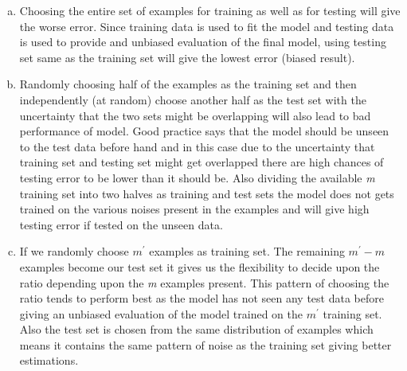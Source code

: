 \documentclass[12pt,letterpaper]{article}
\begin{document}
\begin{enumerate}[a.]
    \item Choosing the entire set of examples for training as well as for testing will give the worse error. Since training data is used to fit the model and testing data is used to provide and unbiased evaluation of the final model, using testing set same as the training set will give the lowest error (biased result).
    \item Randomly choosing half of the examples as the training set and then independently (at random) choose another half as the test set with the uncertainty that the two sets might be overlapping will also lead to bad performance of model. Good practice says that the model should be unseen to the test data before hand and in this case due to the uncertainty that training set and testing set might get overlapped there are high chances of testing error to be lower than it should be. Also dividing the available \textit{m} training set into two halves as training and test sets the model does not gets trained on the various noises present in the  examples and will give high testing error if tested on the unseen data.
    \item If we randomly choose $m^\prime$ examples as training set. The remaining $m^\prime - m$ examples become our test set it gives us the flexibility to decide upon the ratio depending upon the \textit{m} examples present. This pattern of choosing the ratio tends to perform best as the model has not seen any test data before giving an unbiased evaluation of the model trained on the $m^\prime$ training set. Also the test set is chosen from the same distribution of examples which means it contains the same pattern of noise as the training set giving better estimations.
\end{enumerate}
\end{document}
